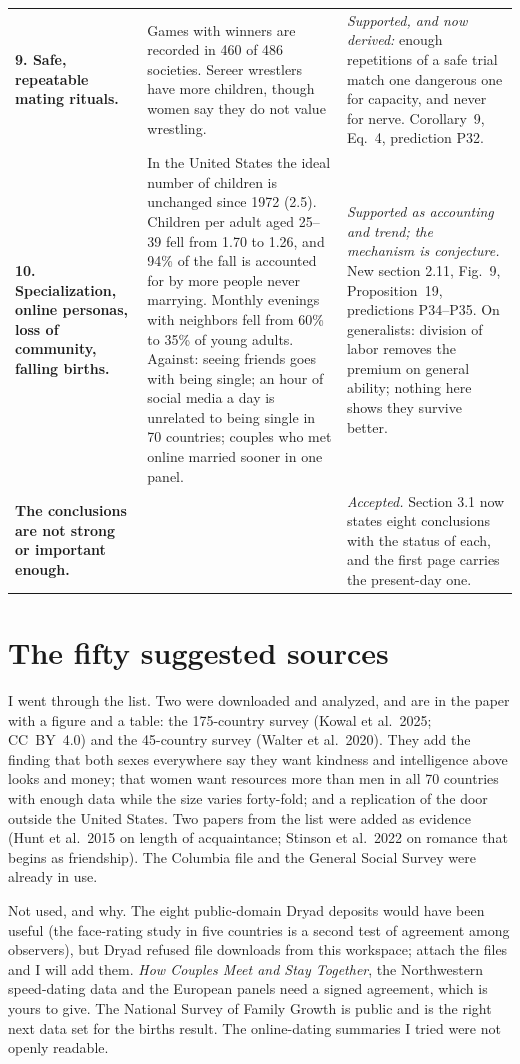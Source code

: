 \documentclass[10pt,letterpaper]{extarticle}
\newcommand{\lab}[1]{\textbf{#1}}
\begin{document}
{\begin{longtable}{@{}P{0.20\textwidth}P{0.42\textwidth}P{0.31\textwidth}@{}}
\lab{9. Safe, repeatable mating rituals.} & Games with winners are recorded in 460 of 486 societies. Sereer wrestlers have more children, though women say they do not value wrestling. & \emph{Supported, and now derived:} enough repetitions of a safe trial match one dangerous one for capacity, and never for nerve. Corollary~9, Eq.~4, prediction P32.\\
\lab{10. Specialization, online personas, loss of community, falling births.} & In the United States the ideal number of children is unchanged since 1972 (2.5). Children per adult aged 25--39 fell from 1.70 to 1.26, and 94\% of the fall is accounted for by more people never marrying. Monthly evenings with neighbors fell from 60\% to 35\% of young adults. Against: seeing friends goes with being single; an hour of social media a day is unrelated to being single in 70 countries; couples who met online married sooner in one panel. & \emph{Supported as accounting and trend; the mechanism is conjecture.} New section 2.11, Fig.~9, Proposition~19, predictions P34--P35. On generalists: division of labor removes the premium on general ability; nothing here shows they survive better.\\
\lab{The conclusions are not strong or important enough.} & & \emph{Accepted.} Section 3.1 now states eight conclusions with the status of each, and the first page carries the present-day one.\\
\bottomrule
\end{longtable}}

\section{The fifty suggested sources}

I went through the list. Two were downloaded and analyzed, and are in the paper with a figure and a table: the
175-country survey (Kowal et al.\ 2025; CC~BY~4.0) and the 45-country survey (Walter et al.\ 2020). They add the finding
that both sexes everywhere say they want kindness and intelligence above looks and money; that women want resources more
than men in all 70 countries with enough data while the size varies forty-fold; and a replication of the door outside the
United States. Two papers from the list were added as evidence (Hunt et al.\ 2015 on length of acquaintance; Stinson et
al.\ 2022 on romance that begins as friendship). The Columbia file and the General Social Survey were already in use.

Not used, and why. The eight public-domain Dryad deposits would have been useful (the face-rating study in five countries
is a second test of agreement among observers), but Dryad refused file downloads from this workspace; attach the files and
I will add them. \emph{How Couples Meet and Stay Together}, the Northwestern speed-dating data and the European panels need a
signed agreement, which is yours to give. The National Survey of Family Growth is public and is the right next data set
for the births result. The online-dating summaries I tried were not openly readable.
\end{document}
